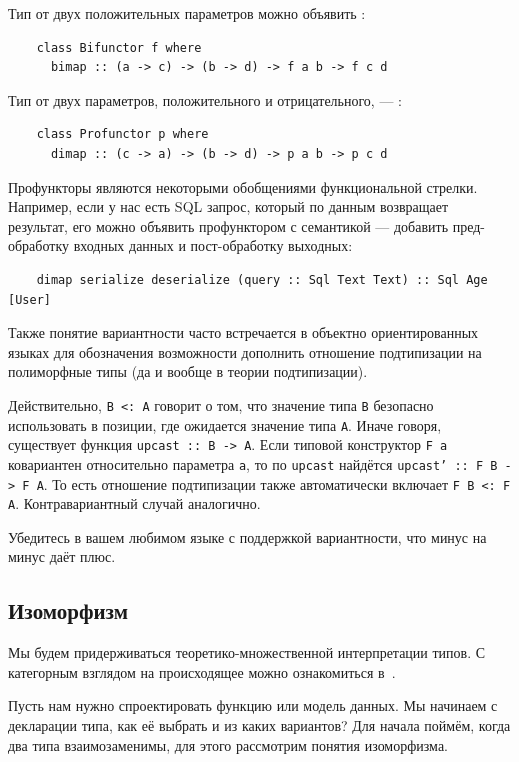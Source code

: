 Тип от двух положительных параметров можно объявить :
\begin{verbatim}
    class Bifunctor f where
      bimap :: (a -> c) -> (b -> d) -> f a b -> f c d
\end{verbatim}

Тип от двух параметров, положительного и отрицательного, --- :
\begin{verbatim}
    class Profunctor p where
      dimap :: (c -> a) -> (b -> d) -> p a b -> p c d
\end{verbatim}

Профункторы являются некоторыми обобщениями функциональной стрелки.
Например, если у нас есть SQL запрос, который по данным возвращает результат, его можно объявить профунктором с семантикой --- добавить пред-обработку входных данных и пост-обработку выходных:
\begin{verbatim}
    dimap serialize deserialize (query :: Sql Text Text) :: Sql Age [User]
\end{verbatim}

Также понятие вариантности часто встречается в объектно ориентированных языках для обозначения возможности дополнить отношение подтипизации на полиморфные типы (да и вообще в теории подтипизации).

Действительно,  \texttt{B <: A} говорит о том, что значение типа \texttt{B} безопасно использовать в позиции, где ожидается значение типа \texttt{A}.
Иначе говоря, существует функция \texttt{upcast :: B -> A}.
Если типовой конструктор \texttt{F a} ковариантен относительно параметра \texttt{a}, то по \texttt{upcast} найдётся \texttt{upcast' :: F B -> F A}.
То есть отношение подтипизации также автоматически включает \texttt{F B <: F A}.
Контравариантный случай аналогично.

\begin{task}
    Убедитесь в вашем любимом языке с поддержкой вариантности, что минус на минус даёт плюс.
\end{task}

\subsection{Изоморфизм} \label{subsec:isomorphism}

Мы будем придерживаться теоретико-множественной интерпретации типов.
С категорным взглядом на происходящее можно ознакомиться в~\cite{hinze2010reason}.

Пусть нам нужно спроектировать функцию или модель данных.
Мы начинаем с декларации типа, как её выбрать и из каких вариантов?
Для начала поймём, когда два типа взаимозаменимы, для этого рассмотрим понятия изоморфизма.

